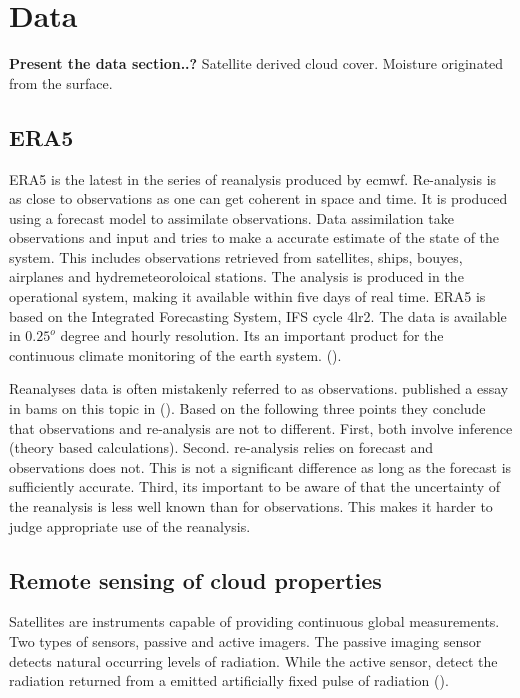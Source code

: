 
\section{Data}
\textbf{Present the data section..?}
Satellite derived cloud cover. Moisture originated from the surface.

\subsection{ERA5} \label{sec:era5}
ERA5 is the latest in the series of reanalysis produced by \acrfull{ecmwf}. Re-analysis is as close to observations as one can get coherent in space and time. It is produced using a forecast model to assimilate observations. Data assimilation take observations and input and tries to make a accurate estimate of the state of the system. This includes observations retrieved from satellites, ships, bouyes, airplanes and hydremeteoroloical stations. The analysis is produced in the operational system, making it available within five days of real time. ERA5 is based on the Integrated Forecasting System, IFS cycle 4lr2. The data is available in $0.25^o$ degree and hourly resolution. Its an important product for the continuous climate monitoring of the earth system. (\cite{Hersbach2018OperationalStatus}).

Reanalyses data is often mistakenly referred to as observations. \citeauthor{Parker2016ReanalysesDifference} published a essay in \acrfull{bams} on this topic in \citeyear{Parker2016ReanalysesDifference} (\cite{Parker2016ReanalysesDifference}). Based on the following three points they conclude that observations and re-analysis are not to different. First, both involve inference (theory based calculations). Second. re-analysis relies on forecast and observations does not. This is not a significant difference as long as the forecast is sufficiently accurate. Third, its important to be aware of that the uncertainty of the reanalysis is less well known than for observations. This makes it harder to judge appropriate use of the reanalysis. 

\subsection{Remote sensing of cloud properties}
Satellites are instruments capable of providing continuous global measurements. Two types of sensors, passive and active imagers. The passive imaging sensor detects natural occurring levels of radiation. While the active sensor,  detect the radiation returned from a emitted artificially fixed pulse of radiation (\cite{Stephens2018CloudsatSystem}).



